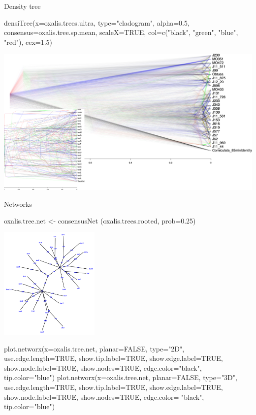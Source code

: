 \documentclass[compress, ucs, xelatex, 11pt, xcolor=svgnames,
  hyperref={
    bookmarks=true,
    unicode=true,
    colorlinks=true,
    pdftitle={Molecular data in R},
    plainpages=false,
    pdfauthor={Vojtech Zeisek},
    pdfsubject={Course about phylogeny and evolution in R},
    pdfcreator={XeLaTeX},
    pdfkeywords={R, evolution, phylogeny, molecular data},
    linkcolor=Tomato,
    anchorcolor=SaddleBrown,
    citecolor=Goldenrod,
    filecolor=DarkMagenta,
    menucolor=Sienna,
    urlcolor=DarkTurquoise,
    pdftex},
  url={hyphens, lowtilde} %
  ]{beamer}
\begin{document}
\begin{frame}[fragile]{Density tree}
  \begin{spluscode}
    densiTree(x=oxalis.trees.ultra, type="cladogram", alpha=0.5,
      consensus=oxalis.tree.sp.mean, scaleX=TRUE, col=c("black",
      "green", "blue", "red"), cex=1.5)
  \end{spluscode}
\begin{center}
  \includegraphics[width=\textwidth-1.5cm]{oxalis_density_good.png}
\end{center}
\end{frame}

\begin{frame}[fragile]{Networks}
\begin{multicols}{2}
  \begin{spluscode}
    oxalis.tree.net <- consensusNet
      (oxalis.trees.rooted, prob=0.25)
  \end{spluscode}
  \includegraphics[height=5.5cm]{oxalis-net.png}
  \columnbreak
  \begin{spluscode}
    plot.networx(x=oxalis.tree.net,
      planar=FALSE, type="2D",
      use.edge.length=TRUE,
      show.tip.label=TRUE,
      show.edge.label=TRUE,
      show.node.label=TRUE,
      show.nodes=TRUE,
      edge.color="black",
      tip.color="blue")
    plot.networx(x=oxalis.tree.net,
      planar=FALSE, type="3D",
      use.edge.length=TRUE,
      show.tip.label=TRUE,
      show.edge.label=TRUE,
      show.node.label=TRUE,
      show.nodes=TRUE, edge.color=
      "black", tip.color="blue")
  \end{spluscode}
\end{multicols}
\end{frame}
\end{document}
